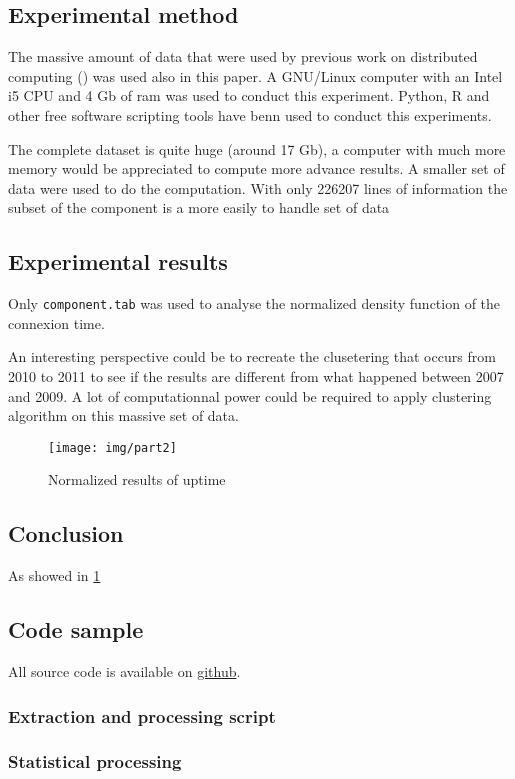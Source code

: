 \documentclass{sig-alternate-10pt}
\begin{document}
\subsection{Experimental method}

The massive amount of data that were used by previous work on distributed computing (\cite{ja_ko_mascots09})
was used also in this paper. A GNU/Linux computer with an Intel i5 CPU and 4 Gb of ram was used to conduct this
experiment. Python, R and other free software scripting tools have benn used to conduct this experiments.

The complete dataset is quite huge (around 17 Gb), a computer with much more memory would be appreciated to
compute more advance results. A smaller set of data were used to do the computation. With only 226207 lines 
of information the subset of the component is a more easily to handle set of data

\subsection{Experimental results}

Only \texttt{component.tab} was used to analyse the normalized density function of the connexion time.

An interesting perspective could be to recreate the clusetering that occurs from 2010 to 2011 to see if
the results are different from what happened between 2007 and 2009. A lot of computationnal power could be 
required to apply clustering algorithm on this massive set of data.




\begin{figure}[h]
\begin{center}
\texttt{[image: img/part2]}
\end{center}
\caption{Normalized results of uptime}
\label{part2}
\end{figure}


\subsection{Conclusion}

As showed in \ref{part2}


\subsection{Code sample}

All source code is available on 
\href{https://github.com/sieben/upmc/tree/master/methodologie/homework2-gnuplot}{github}.

\subsubsection{Extraction and processing script}



\subsubsection{Statistical processing}





\end{document}
